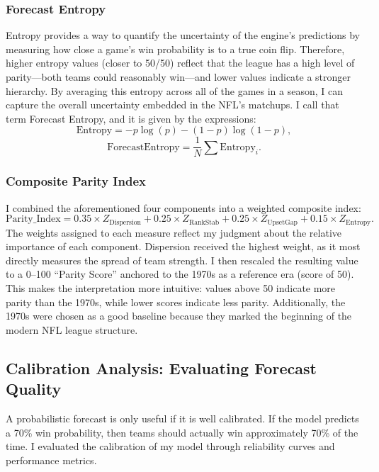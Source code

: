 \documentclass[a4paper,10.5pt,twoside]{article}
\begin{document}
\subsubsection{Forecast Entropy}

Entropy provides a way to quantify the uncertainty of the engine’s predictions by measuring how close a game's win probability is to a true coin flip. Therefore, higher entropy values (closer to 50/50) reflect that the league has a high level of parity—both teams could reasonably win—and lower values indicate a stronger hierarchy. By averaging this entropy across all of the games in a season, I can capture the overall uncertainty embedded in the NFL's matchups. I call that term Forecast Entropy, and it is given by the expressions:
\[
\text{Entropy} = -p \log(p) - (1-p) \log(1-p),
\]
\[
\text{ForecastEntropy} = \frac{1}{N} \sum \text{Entropy}_i.
\]

\subsubsection{Composite Parity Index}

I combined the aforementioned four components into a weighted composite index:
\[
\text{Parity\_Index} = 0.35 \times Z_{\text{Dispersion}} + 0.25 \times Z_{\text{RankStab}} + 0.25 \times Z_{\text{UpsetGap}} + 0.15 \times Z_{\text{Entropy}}.
\]
The weights assigned to each measure reflect my judgment about the relative importance of each component. Dispersion received the highest weight, as it most directly measures the spread of team strength. I then rescaled the resulting value to a 0--100 ``Parity Score'' anchored to the 1970s as a reference era (score of 50). This makes the interpretation more intuitive: values above 50 indicate more parity than the 1970s, while lower scores indicate less parity. Additionally, the 1970s were chosen as a good baseline because they marked the beginning of the modern NFL league structure.

\subsection{Calibration Analysis: Evaluating Forecast Quality}

A probabilistic forecast is only useful if it is well calibrated. If the model predicts a 70\% win probability, then teams should actually win approximately 70\% of the time. I evaluated the calibration of my model through reliability curves and performance metrics.
\end{document}
